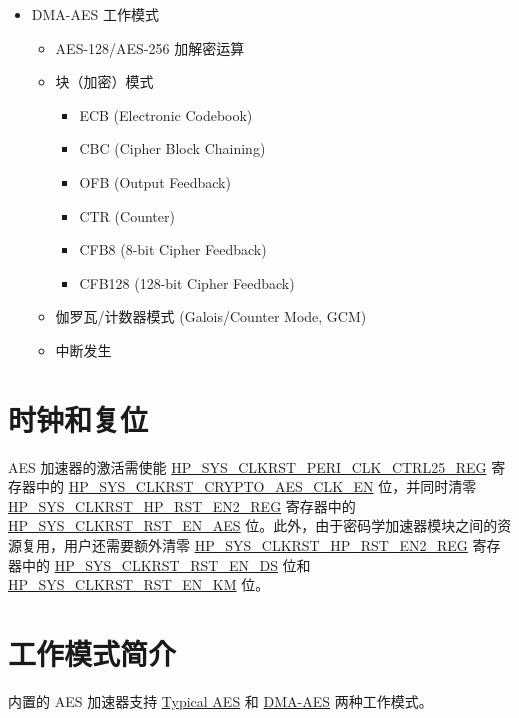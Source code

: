 \documentclass[main\_\_CN.tex]{subfiles}
\begin{document}
    \begin{itemize}
    \item DMA-AES 工作模式
        \begin{itemize}
            \item AES-128/AES-256 加解密运算
            \item 块（加密）模式
                \begin{itemize}
                    \item ECB (Electronic Codebook)
                    \item CBC (Cipher Block Chaining)
                    \item OFB (Output Feedback)
                    \item CTR (Counter)
                    \item CFB8 (8-bit Cipher Feedback)
                    \item CFB128 (128-bit Cipher Feedback)
                \end{itemize}
            \item 伽罗瓦/计数器模式 (Galois/Counter Mode, GCM)
            \item 中断发生
        \end{itemize}
    \end{itemize}

\section{时钟和复位}

AES 加速器的激活需使能 \hyperref[regdesc:HPSYSCLKRSTPERICLKCTRL25REG]{HP\_SYS\_CLKRST\_PERI\_CLK\_CTRL25\_REG} 寄存器中的 \hyperref[fielddesc:HPSYSCLKRSTCRYPTOAESCLKEN]{HP\_SYS\_CLKRST\_CRYPTO\_AES\_CLK\_EN} 位，并同时清零\hyperref[regdesc:HPSYSCLKRSTHPRSTEN2REG]{HP\_SYS\_CLKRST\_HP\_RST\_EN2\_REG} 寄存器中的 \hyperref[fielddesc:HPSYSCLKRSTRSTENAES]{HP\_SYS\_CLKRST\_RST\_EN\_AES} 位。此外，由于密码学加速器模块之间的资源复用，用户还需要额外清零 \hyperref[regdesc:HPSYSCLKRSTHPRSTEN2REG]{HP\_SYS\_CLKRST\_HP\_RST\_EN2\_REG} 寄存器中的 \hyperref[fielddesc:HPSYSCLKRSTRSTENDS]{HP\_SYS\_CLKRST\_RST\_EN\_DS} 位和 \hyperref[fielddesc:HPSYSCLKRSTRSTENKM]{HP\_SYS\_CLKRST\_RST\_EN\_KM} 位。



\section{工作模式简介}

\chipname{} 内置的 AES 加速器支持 \hyperref[sec:aes-typical-modes]{Typical AES} 和 \hyperref[sec:aes-dma-aes]{DMA-AES} 两种工作模式。
\end{document}
